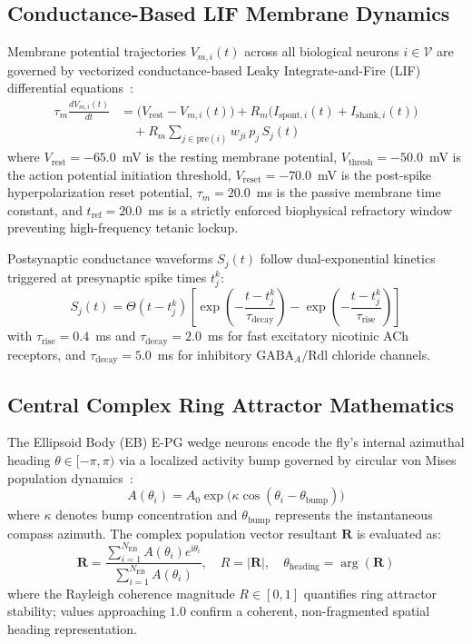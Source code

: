\documentclass[10pt,twocolumn]{article}
\begin{document}
\subsection{Conductance-Based LIF Membrane Dynamics}
Membrane potential trajectories $V_{m,i}(t)$ across all biological neurons $i \in \mathcal{V}$ are governed by vectorized conductance-based Leaky Integrate-and-Fire (LIF) differential equations~\cite{izhikevich2003simple}:
\begin{equation}
\begin{aligned}
\tau_m \frac{dV_{m,i}(t)}{dt} &= \big(V_{\text{rest}} - V_{m,i}(t)\big) + R_m \big(I_{\text{spont},i}(t) + I_{\text{shank},i}(t)\big) \\
&\quad + R_m \sum_{j \in \text{pre}(i)} w_{ji}\, p_j\, S_j(t)
\end{aligned}
\label{eq:lif}
\end{equation}
where $V_{\text{rest}} = -65.0$~mV is the resting membrane potential, $V_{\text{thresh}} = -50.0$~mV is the action potential initiation threshold, $V_{\text{reset}} = -70.0$~mV is the post-spike hyperpolarization reset potential, $\tau_m = 20.0$~ms is the passive membrane time constant, and $t_{\text{ref}} = 20.0$~ms is a strictly enforced biophysical refractory window preventing high-frequency tetanic lockup.

Postsynaptic conductance waveforms $S_j(t)$ follow dual-exponential kinetics triggered at presynaptic spike times $t_j^k$:
\begin{equation}
S_j(t) = \Theta(t - t_j^k) \left[ \exp\!\left(-\frac{t - t_j^k}{\tau_{\text{decay}}}\right) - \exp\!\left(-\frac{t - t_j^k}{\tau_{\text{rise}}}\right) \right]
\end{equation}
with $\tau_{\text{rise}} = 0.4$~ms and $\tau_{\text{decay}} = 2.0$~ms for fast excitatory nicotinic ACh receptors, and $\tau_{\text{decay}} = 5.0$~ms for inhibitory $\text{GABA}_A/\text{Rdl}$ chloride channels.

\subsection{Central Complex Ring Attractor Mathematics}
The Ellipsoid Body (EB) E-PG wedge neurons encode the fly's internal azimuthal heading $\theta \in [-\pi, \pi)$ via a localized activity bump governed by circular von Mises population dynamics~\cite{seelig2015neural, green2017neural}:
\begin{equation}
A(\theta_i) = A_0 \exp\!\big(\kappa \cos(\theta_i - \theta_{\text{bump}})\big)
\end{equation}
where $\kappa$ denotes bump concentration and $\theta_{\text{bump}}$ represents the instantaneous compass azimuth. The complex population vector resultant $\mathbf{R}$ is evaluated as:
\begin{equation}
\mathbf{R} = \frac{\sum_{i=1}^{N_{\text{EB}}} A(\theta_i) e^{\mathrm{i} \theta_i}}{\sum_{i=1}^{N_{\text{EB}}} A(\theta_i)}, \quad R = |\mathbf{R}|, \quad \theta_{\text{heading}} = \arg(\mathbf{R})
\end{equation}
where the Rayleigh coherence magnitude $R \in [0, 1]$ quantifies ring attractor stability; values approaching $1.0$ confirm a coherent, non-fragmented spatial heading representation.
\end{document}
